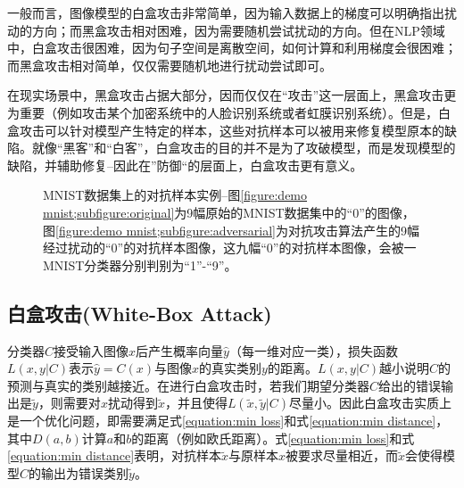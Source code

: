\documentclass[journal, a4paper]{IEEEtran}
\begin{document}
一般而言，图像模型的白盒攻击非常简单，因为输入数据上的梯度可以明确指出扰动的方向；而黑盒攻击相对困难，因为需要随机尝试扰动的方向。但在NLP领域中，白盒攻击很困难，因为句子空间是离散空间，如何计算和利用梯度会很困难；而黑盒攻击相对简单，仅仅需要随机地进行扰动尝试即可。

在现实场景中，黑盒攻击占据大部分，因而仅仅在``攻击''这一层面上，黑盒攻击更为重要（例如攻击某个加密系统中的人脸识别系统或者虹膜识别系统）。但是，白盒攻击可以针对模型产生特定的样本，这些对抗样本可以被用来修复模型原本的缺陷。就像``黑客''和``白客''，白盒攻击的目的并不是为了攻破模型，而是发现模型的缺陷，并辅助修复--因此在''防御``的层面上，白盒攻击更有意义。

\begin{figure}[t]\footnotesize
    \centering
    \caption{MNIST数据集上的对抗样本实例--图\ref{figure:demo mnist;subfigure:original}为9幅原始的MNIST数据集中的``0''的图像，图\ref{figure:demo mnist;subfigure:adversarial}为对抗攻击算法产生的9幅经过扰动的``0''的对抗样本图像，这九幅``0''的对抗样本图像，会被一MNIST分类器分别判别为``1''-``9''。}
    \label{figure:demo mnist}
\end{figure}

\subsection{白盒攻击(White-Box Attack)}
\label{section:adversarial attack;subsection:white-box}

分类器$C$接受输入图像$x$后产生概率向量$\hat y$（每一维对应一类），损失函数$L(x,y|C)$表示$\hat y=C(x)$与图像$x$的真实类别$y$的距离。$L(x,y|C)$越小说明$C$的预测与真实的类别越接近。在进行白盒攻击时，若我们期望分类器$C$给出的错误输出是$\tilde y$，则需要对$x$扰动得到$\tilde x$，并且使得$L(\tilde x,\tilde y|C)$尽量小。因此白盒攻击实质上是一个优化问题，即需要满足式\ref{equation:min loss}和式\ref{equation:min distance}，其中$D(a,b)$计算$a$和$b$的距离（例如欧氏距离）。式\ref{equation:min loss}和式\ref{equation:min distance}表明，对抗样本$\tilde x$与原样本$x$被要求尽量相近，而$\tilde x$会使得模型$C$的输出为错误类别$\tilde y$。
\end{document}
